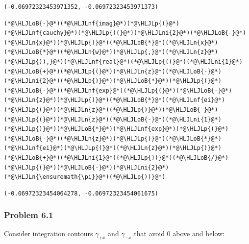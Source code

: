 \documentclass[12pt,a4paper]{article}
\newcommand{\HLJLn}[1]{#1}
\newcommand{\HLJLnf}[1]{\textcolor[RGB]{66,102,213}{#1}}
\newcommand{\HLJLni}[1]{\textcolor[RGB]{59,151,46}{#1}}
\newcommand{\HLJLoB}[1]{\textcolor[RGB]{102,102,102}{\textbf{#1}}}
\newcommand{\HLJLp}[1]{#1}
\begin{document}
\begin{lstlisting}
(-0.06972323453971352, -0.06972323453971373)
\end{lstlisting}


\begin{lstlisting}
(*@\HLJLoB{-}@*)(*@\HLJLnf{imag}@*)(*@\HLJLp{(}@*)(*@\HLJLnf{cauchy}@*)(*@\HLJLp{((}@*)(*@\HLJLni{2}@*)(*@\HLJLoB{-}@*)(*@\HLJLn{x}@*)(*@\HLJLp{)}@*)(*@\HLJLoB{*}@*)(*@\HLJLn{x}@*)(*@\HLJLoB{*}@*)(*@\HLJLn{w}@*)(*@\HLJLp{,}@*)(*@\HLJLn{z}@*)(*@\HLJLp{)),}@*)(*@\HLJLnf{real}@*)(*@\HLJLp{((}@*)(*@\HLJLni{1}@*)(*@\HLJLoB{+}@*)(*@\HLJLp{(}@*)(*@\HLJLn{z}@*)(*@\HLJLoB{-}@*)(*@\HLJLni{2}@*)(*@\HLJLp{)}@*)(*@\HLJLoB{*}@*)(*@\HLJLp{(}@*)(*@\HLJLoB{-}@*)(*@\HLJLnf{exp}@*)(*@\HLJLp{(}@*)(*@\HLJLoB{-}@*)(*@\HLJLn{z}@*)(*@\HLJLp{)}@*)(*@\HLJLoB{*}@*)(*@\HLJLnf{ei}@*)(*@\HLJLp{(}@*)(*@\HLJLn{z}@*)(*@\HLJLp{)}@*)(*@\HLJLoB{-}@*)(*@\HLJLp{(}@*)(*@\HLJLn{z}@*)(*@\HLJLoB{-}@*)(*@\HLJLni{1}@*)(*@\HLJLp{)}@*)(*@\HLJLoB{*}@*)(*@\HLJLnf{exp}@*)(*@\HLJLp{(}@*)(*@\HLJLoB{-}@*)(*@\HLJLn{z}@*)(*@\HLJLp{)}@*)(*@\HLJLoB{*}@*)(*@\HLJLnf{ei}@*)(*@\HLJLp{(}@*)(*@\HLJLn{z}@*)(*@\HLJLp{)}@*)(*@\HLJLoB{+}@*)(*@\HLJLni{1}@*)(*@\HLJLp{))}@*)(*@\HLJLoB{/}@*)(*@\HLJLp{(}@*)(*@\HLJLoB{-}@*)(*@\HLJLni{2}@*)(*@\HLJLn{\ensuremath{\pi}}@*)(*@\HLJLp{))}@*)
\end{lstlisting}

\begin{lstlisting}
(-0.06972323454064278, -0.06972323454061675)
\end{lstlisting}


\subsubsection{Problem 6.1}
Consider integration contours $\gamma_{+x}$ and $\gamma_{-x}$ that avoid $0$ above and below:
\end{document}
